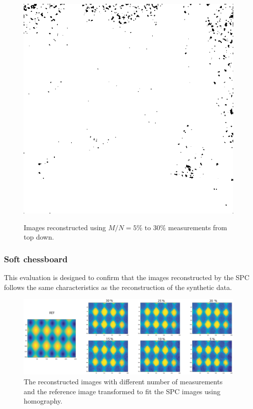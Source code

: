 \begin{figure}[H]
\begin{minipage}[t]{0.3\linewidth}
	\label{fig:hus_m30}
\end{minipage}
\begin{minipage}[t]{0.3\linewidth} %
	\includegraphics[width = 1\linewidth]{gfx/sit/sit_m30.png}
	\label{fig:sit_m30}
\end{minipage}
	\caption{Images reconstructed using $M/N = 5\% \text{ to } 30\%$ measurements from top down.} 
\end{figure}

\subsubsection{Soft chessboard}
This evaluation is designed to confirm that the images reconstructed by the SPC follows the same characteristics as the reconstruction of the synthetic data.

\begin{figure}[H]
    \centering
    \includegraphics[width=1\linewidth]{result/homo/Hom_im.eps}
    \caption{The reconstructed images with different number of measurements and the reference image transformed to fit the SPC images using homography.}
    \label{fig:hom_over_im}
\end{figure}

